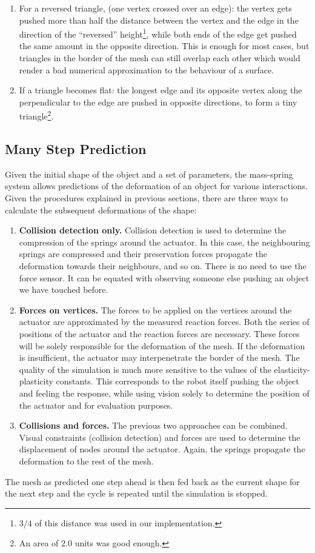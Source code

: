 \documentclass[journal]{IEEEtran}
\begin{document}
\begin{enumerate}
 \item For a reversed triangle, (one vertex crossed over an edge): the vertex gets pushed more than half the distance between the vertex and the edge in the direction of the ``reversed'' height\footnote{$3/4$ of this distance was used in our implementation.}, while both ends of the edge get pushed the same amount in the opposite direction.  This is enough for most cases, but triangles in the border of the mesh can still overlap each other which would render a bad numerical approximation to the behaviour of a surface.

 \item If a triangle becomes flat: the longest edge and its opposite vertex along the perpendicular to the edge are pushed in opposite directions, to form a tiny triangle\footnote{An area of $2.0$ units was good enough.}.
\end{enumerate}

\subsection{Many Step Prediction}
\label{sec:manysteps}

Given the initial shape of the object and a set of parameters, the mass-spring system allows predictions of the deformation of an object for various interactions.  Given the procedures explained in previous sections, there are three ways to calculate the subsequent deformations of the shape:
\begin{enumerate}
 \item \textbf{Collision detection only.} Collision detection is used to determine the compression of the springs around the actuator.  In this case, the neighbouring springs are compressed and their preservation forces propagate the deformation towards their neighbours, and so on.  There is no need to use the force sensor.  It can be equated with observing someone else pushing an object we have touched before.
 \item \textbf{Forces on vertices.} The forces to be applied on the  vertices around the actuator are approximated by the measured reaction forces.  Both the series of positions of the actuator and the reaction forces are necessary.  These forces will be solely responsible for the deformation of the mesh.  If the deformation is insufficient, the actuator may interpenetrate the border of the mesh.  The quality of the simulation is much more sensitive to the values of the elasticity-plasticity constants.  This corresponds to the robot itself pushing the object and feeling the response, while using vision solely to determine the position of the actuator and for evaluation purposes.
 \item \textbf{Collisions and forces.} The previous two approaches can be combined.  Visual constraints (collision detection) and forces are used to determine the displacement of nodes around the actuator.  Again, the springs propagate the deformation to the rest of the mesh.
\end{enumerate}
The mesh as predicted one step ahead is then fed back as the current shape for the next step and the cycle is repeated until the simulation is stopped.
\end{document}
